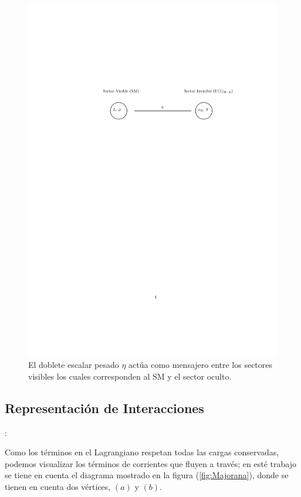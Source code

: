 \documentclass[12pt]{article}
\begin{document}
\begin{figure}[h!]
\begin{center} 
\includegraphics[scale=1.0]{sectors.pdf}
\caption{ El doblete escalar pesado $\eta$ actúa como mensajero entre los sectores visibles los cuales corresponden al SM y el sector oculto.}
\label{fig:sectores}
\end{center}
\end{figure}


\subsection{Representación de Interacciones}:

Como los términos en el Lagrangiano respetan todas las cargas conservadas, podemos visualizar los términos de corrientes que fluyen %
a través; en esté trabajo se tiene en cuenta el diagrama mostrado en la figura (\ref{fig:Majorana}),  donde se tienen en cuenta dos vértices, $(a)$ y $(b)$. 
\end{document}
